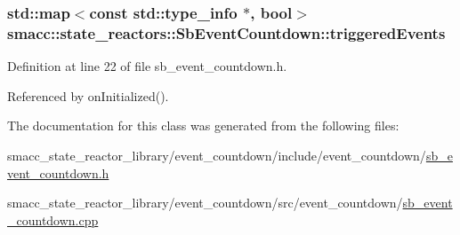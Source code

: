 \subsubsection[{\texorpdfstring{triggered\+Events}{triggeredEvents}}]{\setlength{\rightskip}{0pt plus 5cm}std\+::map$<$const std\+::type\+\_\+info $\ast$, {\bf bool}$>$ smacc\+::state\+\_\+reactors\+::\+Sb\+Event\+Countdown\+::triggered\+Events\hspace{0.3cm}{\ttfamily [private]}}\hypertarget{classsmacc_1_1state__reactors_1_1SbEventCountdown_a4af21c5dacb7ecac339cce0d253db6b2}{}\label{classsmacc_1_1state__reactors_1_1SbEventCountdown_a4af21c5dacb7ecac339cce0d253db6b2}


Definition at line 22 of file sb\+\_\+event\+\_\+countdown.\+h.



Referenced by on\+Initialized().



The documentation for this class was generated from the following files\+:\begin{DoxyCompactItemize}
\item 
smacc\+\_\+state\+\_\+reactor\+\_\+library/event\+\_\+countdown/include/event\+\_\+countdown/\hyperlink{sb__event__countdown_8h}{sb\+\_\+event\+\_\+countdown.\+h}\item 
smacc\+\_\+state\+\_\+reactor\+\_\+library/event\+\_\+countdown/src/event\+\_\+countdown/\hyperlink{sb__event__countdown_8cpp}{sb\+\_\+event\+\_\+countdown.\+cpp}\end{DoxyCompactItemize}
